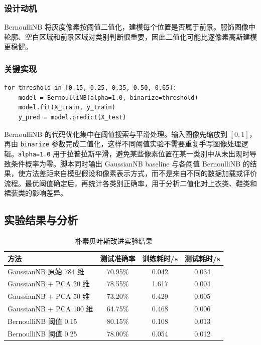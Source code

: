 \documentclass[UTF8]{ctexart}
\begin{document}
\subsubsection{设计动机}

BernoulliNB 将灰度像素按阈值二值化，建模每个位置是否属于前景。服饰图像中轮廓、空白区域和前景区域对类别判断很重要，因此二值化可能比逐像素高斯建模更稳健。

\subsubsection{关键实现}

\begin{lstlisting}[caption={BernoulliNB 阈值实验}]
for threshold in [0.15, 0.25, 0.35, 0.50, 0.65]:
    model = BernoulliNB(alpha=1.0, binarize=threshold)
    model.fit(X_train, y_train)
    y_pred = model.predict(X_test)
\end{lstlisting}

BernoulliNB 的代码优化集中在阈值搜索与平滑处理。输入图像先缩放到 $[0,1]$，再由 \texttt{binarize} 参数完成二值化，这样不同阈值实验不需要重复手写图像处理逻辑。\texttt{alpha=1.0} 用于拉普拉斯平滑，避免某些像素位置在某一类别中从未出现时导致条件概率为零。脚本同时输出 GaussianNB baseline 与各阈值 BernoulliNB 的结果，使方法差距来自模型假设和像素表示方式，而不是来自不同的数据加载或评价流程。最优阈值确定后，再统计各类别正确率，用于分析二值化对上衣类、鞋类和裙装类的影响差异。

\subsection{实验结果与分析}

\begin{table}[H]
\centering
\caption{朴素贝叶斯改进实验结果}
\begin{tabular}{lccc}
\toprule
方法 & 测试准确率 & 训练耗时/s & 测试耗时/s\\
\midrule
GaussianNB 原始 784 维 & 70.95\% & 0.042 & 0.034\\
GaussianNB + PCA 20 维 & 78.55\% & 1.617 & 0.004\\
GaussianNB + PCA 50 维 & 73.20\% & 0.429 & 0.005\\
GaussianNB + PCA 100 维 & 64.75\% & 0.468 & 0.006\\
BernoulliNB 阈值 0.15 & 80.15\% & 0.108 & 0.013\\
BernoulliNB 阈值 0.25 & 78.00\% & 0.054 & 0.012\\
\bottomrule
\end{tabular}
\end{table}
\end{document}
